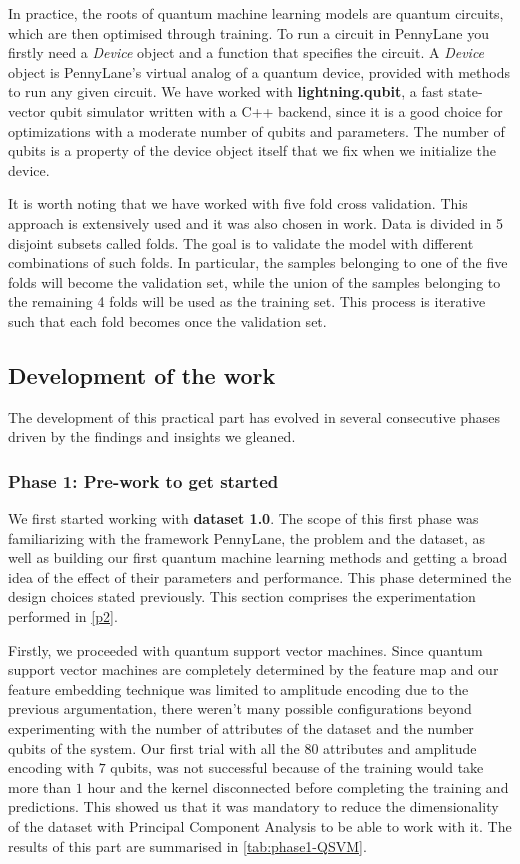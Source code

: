 In practice, the roots of quantum machine learning models are quantum circuits, which are then optimised through training. To run a circuit in PennyLane you firstly need a \textit{Device} object and a function that specifies the circuit. A \textit{Device} object is PennyLane's virtual analog of a quantum device, provided with methods to run any given circuit. We have worked with \textbf{lightning.qubit}, a fast state-vector qubit simulator written with a C++ backend, since it is a good choice for optimizations with a moderate number of qubits and parameters. The number of qubits is a property of the device object itself that we fix when we initialize the device. 

It is worth noting that we have worked with five fold cross validation. This approach is extensively used and it was also chosen in \cite{casale2023large} work. Data is divided in 5 disjoint subsets called folds. The goal is to validate the model with different combinations of such folds. In particular, the samples belonging to one of the five folds will become the validation set, while the union of the samples belonging to the remaining 4 folds will be used as the training set. This process is iterative such that each fold becomes once the validation set.

\subsection{Development of the work}
The development of this practical part has evolved in several consecutive phases driven by the findings and insights we gleaned. 

\subsubsection{Phase 1: Pre-work to get started}
We first started working with \textbf{dataset 1.0}. The scope of this first phase was familiarizing with the framework PennyLane, the problem and the dataset, as well as building our first quantum machine learning methods and getting a broad idea of the effect of their parameters and performance.  This phase determined the design choices stated previously. This section comprises the experimentation performed in \autoref{p2}.

Firstly, we proceeded with quantum support vector machines. Since quantum support vector machines are completely determined by the feature map and our feature embedding technique was limited to amplitude encoding due to the previous argumentation, there weren't many possible configurations beyond experimenting with the number of attributes of the dataset and the number qubits of the system. Our first trial with all the $80$ attributes and amplitude encoding with $7$ qubits, was not successful because of the training would take more than $1$ hour and the kernel disconnected before completing the training and predictions. This showed us that it was mandatory to reduce the dimensionality of the dataset with Principal Component Analysis to be able to work with it. The results of this part are summarised in \autoref{tab:phase1-QSVM}.


